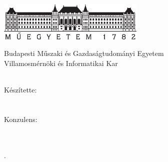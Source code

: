 \begin{titlepage}
  \begin{center}  
  \includegraphics[width=7cm]{./figures/bme_logo.pdf}
  \vspace{0.3cm}
  
  Budapesti Műszaki és Gazdaságtudományi Egyetem \\
  Villamosmérnöki és Informatikai Kar \\
  \viktanszek \\
  \vspace{5cm}
  
  \huge {\vikcim}
  \vspace{1.5cm}
  
  \large {\textbf{\vikdoktipus}}
  \vfill
    
  {\Large 
  	Készítette: \\ \vspace{0.3cm}
  	\vikszerzoA \\
	\tdkszerzoB \\
  	\vspace{1.5cm}
  	Konzulens: \\ \vspace{0.3cm}
  	\vikkonzulensA \\
  	\vikkonzulensB \\
  }
  
  \vspace{2cm}
  \large {\tdkev.}
 \end{center}
\end{titlepage}
